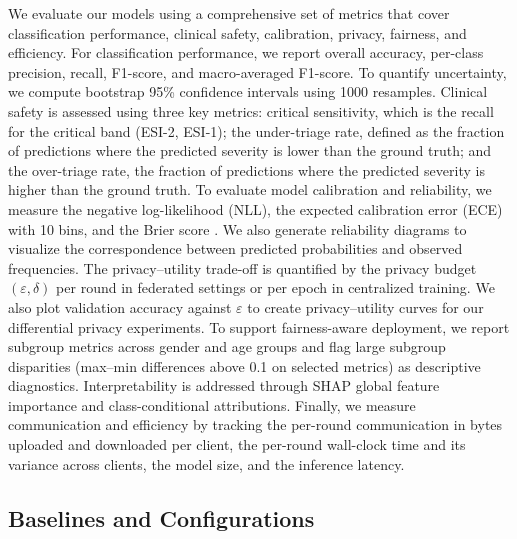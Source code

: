 \documentclass[journal,article,submit,pdftex,moreauthors]{Definitions/mdpi}
\begin{document}
We evaluate our models using a comprehensive set of metrics that cover classification performance, clinical safety, calibration, privacy, fairness, and efficiency. For classification performance, we report overall accuracy, per-class precision, recall, F1-score, and macro-averaged F1-score. To quantify uncertainty, we compute bootstrap 95\% confidence intervals using 1000 resamples. Clinical safety is assessed using three key metrics: critical sensitivity, which is the recall for the critical band (ESI-2, ESI-1); the under-triage rate, defined as the fraction of predictions where the predicted severity is lower than the ground truth; and the over-triage rate, the fraction of predictions where the predicted severity is higher than the ground truth. To evaluate model calibration and reliability, we measure the negative log-likelihood (NLL), the expected calibration error (ECE) with 10 bins, and the Brier score \cite{guo2017}. We also generate reliability diagrams to visualize the correspondence between predicted probabilities and observed frequencies. The privacy–utility trade-off is quantified by the privacy budget $(\varepsilon, \delta)$ per round in federated settings or per epoch in centralized training. We also plot validation accuracy against $\varepsilon$ to create privacy–utility curves for our differential privacy experiments. To support fairness-aware deployment, we report subgroup metrics across gender and age groups and flag large subgroup disparities (max--min differences above 0.1 on selected metrics) as descriptive diagnostics. Interpretability is addressed through SHAP global feature importance and class-conditional attributions. Finally, we measure communication and efficiency by tracking the per-round communication in bytes uploaded and downloaded per client, the per-round wall-clock time and its variance across clients, the model size, and the inference latency.

\subsection{Baselines and Configurations}
\end{document}
